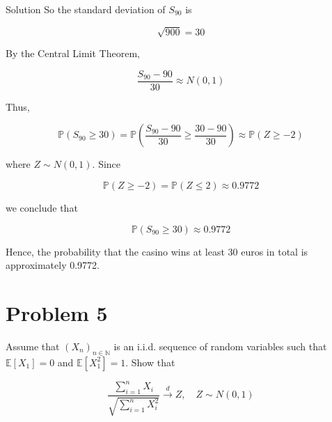 \documentclass{qlnotes-export}
\begin{document}
\begin{qlsolution}{Solution}
So the standard deviation of \(S_{90}\) is

\[\sqrt{900} = 30\]

By the Central Limit Theorem,

\[\frac{S_{90} - 90}{30} \approx N(0,1)\]

Thus,

\[{\mathbb{P}}(S_{90} \geq 30) = {\mathbb{P}}\left( {\frac{S_{90} - 90}{30} \geq \frac{30 - 90}{30}} \right) \approx {\mathbb{P}}(Z \geq - 2)\]

where \(Z \sim N(0,1)\). Since

\[{\mathbb{P}}(Z \geq - 2) = {\mathbb{P}}(Z \leq 2) \approx 0.9772\]

we conclude that

\[{\mathbb{P}}(S_{90} \geq 30) \approx 0.9772\]

Hence, the probability that the casino wins at least 30 euros in total is approximately 0.9772.

\end{qlsolution}

\section{Problem 5}\label{problem-5-6}

Assume that \(\left( X_{n} \right)_{n \in {\mathbb{N}}}\) is an i.i.d. sequence of random variables such that \({\mathbb{E}}\left\lbrack X_{1} \right\rbrack = 0\) and \({\mathbb{E}}\left\lbrack X_{1}^{2} \right\rbrack = 1\). Show that

\[\frac{\sum_{i = 1}^{n}X_{i}}{\sqrt{\sum_{i = 1}^{n}X_{i}^{2}}}\overset{d}{\rightarrow}Z,\quad Z \sim N(0,1)\]
\end{document}
